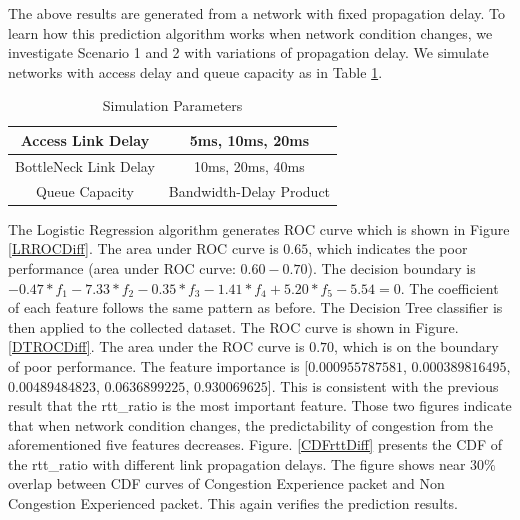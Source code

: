 \par The above results are generated from a network with fixed propagation delay. To learn how this prediction algorithm works when network condition changes, we investigate Scenario 1 and 2 with variations of propagation delay. We simulate networks with access delay and queue capacity as in Table \ref{tab:varyRTT}.
\begin{table}
\begin{center}
\caption {Simulation Parameters} \label{tab:varyRTT}
\begin{tabular}{ |c|c| }
 \hline
 Access Link Delay & 5ms, 10ms, 20ms  \\
 \hline
 BottleNeck Link Delay & 10ms, 20ms, 40ms\\
 \hline
 Queue Capacity & Bandwidth-Delay Product\\
 \hline
\end{tabular}
\end{center}
\end{table}
The Logistic Regression algorithm generates ROC curve which is shown in Figure \ref{LRROCDiff}. The area under ROC curve is $0.65$, which indicates the poor performance (area under ROC curve: $0.60-0.70$). The decision boundary is $ -0.47*f_{1} - 7.33*f_{2} - 0.35
*f_{3} - 1.41*f_{4} + 5.20*f_{5} - 5.54 = 0$. The coefficient of each feature follows the same pattern as before. The Decision Tree classifier is then applied to the collected dataset. The ROC curve is shown in Figure. \ref{DTROCDiff}. The area under the ROC curve is $0.70$, which is on the boundary of poor performance. The feature importance is [$0.000955787581$, $0.000389816495$, $0.00489484823$, $0.0636899225$, $0.930069625$]. This is consistent with the previous result that the rtt\_ratio is the most important feature. Those two figures indicate that when network condition changes, the predictability of congestion from the aforementioned five features decreases. Figure. \ref{CDFrttDiff} presents the CDF of the rtt\_ratio with different link propagation delays. The figure shows near $30\%$ overlap between CDF curves of Congestion Experience packet and Non Congestion Experienced packet. This again verifies the prediction results.
